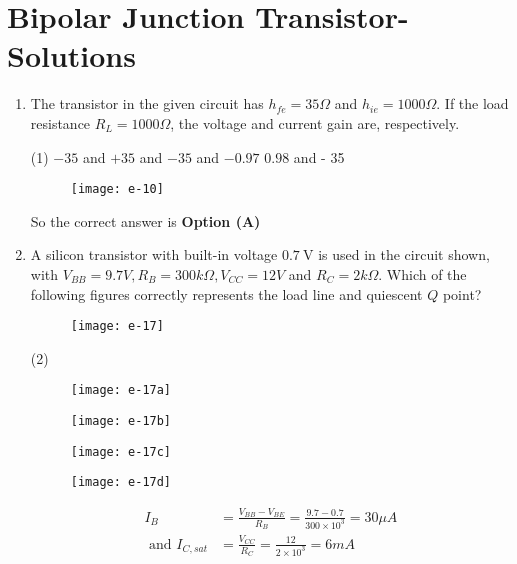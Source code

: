 \chapter{Bipolar Junction Transistor-Solutions}
\begin{enumerate}
	\item The transistor in the given circuit has $h_{f e}=35 \Omega$ and $h_{i e}=1000 \Omega$. If the load resistance $R_{L}=1000 \Omega$, the voltage and current gain are, respectively.
{	}
\begin{tasks}(1)
	\task[\textbf{A.}] $-35$ and $+35$
	 and $-35$
	 and $-0.97$
	\task[\textbf{D.}]  $0.98$ and - 35
\end{tasks}
\begin{figure}[H]
	\centering
	\texttt{[image: e-10]}
\end{figure}
\begin{answer}
So the correct answer is \textbf{Option (A)}
\end{answer}
	\item A silicon transistor with built-in voltage $0.7 \mathrm{~V}$ is used in the circuit shown, with $V_{B B}=9.7 V, R_{B}=300 k \Omega, V_{C C}=12 V$ and $R_{C}=2 k \Omega$. Which of the following figures correctly represents the load line and quiescent $Q$ point?
{	}
\begin{figure}[H]
\centering
\texttt{[image: e-17]}
\end{figure}
\begin{tasks}(2)
\task[\textbf{A.}] \begin{figure}[H]
	\centering
	\texttt{[image: e-17a]}
\end{figure}
\task[\textbf{B.}] \begin{figure}[H]
	\centering
	\texttt{[image: e-17b]}
\end{figure}
\task[\textbf{C.}] \begin{figure}[H]
	\centering
	\texttt{[image: e-17c]}
\end{figure}
\task[\textbf{D.}] \begin{figure}[H]
	\centering
	\texttt{[image: e-17d]}
\end{figure}
\end{tasks}
\begin{answer}
\begin{align*}
I_{B}&=\frac{V_{B B}-V_{B E}}{R_{B}}=\frac{9.7-0.7}{300 \times 10^{3}}=30 \mu A\\\text{ and } I_{C, s a t}&=\frac{V_{C C}}{R_{C}}=\frac{12}{2 \times 10^{3}}=6 m A

\end{align*}
\end{answer}
\end{enumerate}
